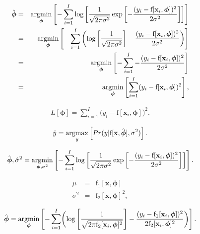 \documentclass[letterpaper,twoside,openany, titlepage,oldfontcommands,titles,dvipsnames]{memoir}
\begin{document}
\begin{eqnarray}\label{eq:loss_normal_full2}
 \hat{\boldsymbol\phi} &=& \mathop{\rm argmin}_{\boldsymbol\phi}\left[-\sum_{i=1}^{I} \log\left[\frac{1}{\sqrt{2\pi\sigma^{2}}}\exp\left[-\frac{(y_i-\mbox{f}[\mathbf{x}_i,\boldsymbol\phi])^{2}}{2\sigma^{2}}\right]\right]\right]
 \nonumber \\
 &=&\mathop{\rm argmin}_{\boldsymbol\phi}\left[-\sum_{i=1}^{I} \left(\log\left[\frac{1}{\sqrt{2\pi\sigma^{2}}}\right] -\frac{(y_i-\mbox{f}[\mathbf{x}_i,\boldsymbol\phi])^{2}}{2\sigma^{2}}\right)\right]\nonumber \\
 &=& \mathop{\rm argmin}_{\boldsymbol\phi}\left[-\sum_{i=1}^{I} -\frac{(y_i-\mbox{f}[\mathbf{x}_i,\boldsymbol\phi])^{2}}{2\sigma^{2}}\right]\nonumber \\
 &=& \mathop{\rm argmin}_{\boldsymbol\phi}\left[\sum_{i=1}^{I} (y_i-\mbox{f}[\mathbf{x}_i,\boldsymbol\phi])^{2}\right],
 \end{eqnarray}

\begin{eqnarray}\label{eq:loss_least_squares}
  L[\boldsymbol\phi] = \sum_{i=1}^{I} \bigl(y_i-\mbox{f}[\mathbf{x}_i,\boldsymbol\phi]\bigr)^{2}.
 \end{eqnarray}

\begin{eqnarray}
  \hat{y} = \mathop{\rm argmax}_{y}\left[Pr(y|\mbox{f}[\mathbf{x},\hat{\boldsymbol\phi}],\sigma^2)\right].
 \end{eqnarray}

\begin{eqnarray}
 \hat{\boldsymbol\phi},\hat{\sigma}^{2} = \mathop{\rm argmin}_{\boldsymbol\phi,\sigma^{2}}\left[-\sum_{i=1}^{I} \log\left[\frac{1}{\sqrt{2\pi\sigma^{2}}}\exp\left[-\frac{(y_i-\mbox{f}[\mathbf{x}_i,\boldsymbol\phi])^{2}}{2\sigma^{2}}\right]\right]\right].
 \end{eqnarray}

\begin{eqnarray}
 \mu &=& \mbox{f}_1[\mathbf{x},\boldsymbol\phi] \nonumber \\
 \sigma^2 &=& \mbox{f}_2[\mathbf{x},\boldsymbol\phi]^2,
 \end{eqnarray}

\begin{eqnarray}
 \hat{\boldsymbol\phi} = \mathop{\rm argmin}_{\boldsymbol\phi}\left[-\sum_{i=1}^{I} \biggl(\log\left[\frac{1}{\sqrt{2\pi\mbox{f}_2[\mathbf{x}_i,\boldsymbol\phi]^2}}\right] -\frac{(y_i-\mbox{f}_1[\mathbf{x}_i,\boldsymbol\phi])^{2}}{2\mbox{f}_2[\mathbf{x}_i,\boldsymbol\phi]^2}\biggr)\right].
 \end{eqnarray}
\end{document}
